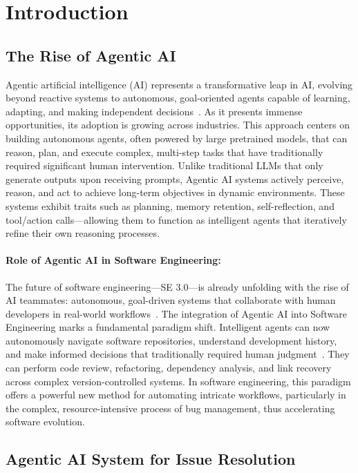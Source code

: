 \section{Introduction}

\subsection{The Rise of Agentic AI}

Agentic artificial intelligence (AI) represents a transformative leap in AI, evolving beyond reactive systems to autonomous, goal-oriented agents capable of learning, adapting, and making independent decisions~\cite{agentic_ai1}. As it presents immense opportunities, its adoption is growing across industries.  This approach centers on building autonomous agents, often powered by large pretrained models, that can reason, plan, and execute complex, multi-step tasks that have traditionally required significant human intervention. Unlike traditional LLMs that only generate outputs upon receiving prompts, Agentic AI systems actively perceive, reason, and act to achieve long-term objectives in dynamic environments. These systems exhibit traits such as planning, memory retention, self-reflection, and tool/action calls—allowing them to function as intelligent agents that iteratively refine their own reasoning processes.

\paragraph{Role of Agentic AI in Software Engineering:}

The future of software engineering—SE 3.0—is already unfolding with the rise of AI teammates: autonomous, goal-driven systems that collaborate with human developers in real-world workflows~\cite{arxiv250715003}. The integration of Agentic AI into Software Engineering marks a fundamental paradigm shift. Intelligent agents can now autonomously navigate software repositories, understand development history, and make informed decisions that traditionally required human judgment~\cite{traceability,btlink}. They can perform code review, refactoring, dependency analysis, and link recovery across complex version-controlled systems. In software engineering, this paradigm offers a powerful new method for automating intricate workflows, particularly in the complex, resource-intensive process of bug management, thus accelerating software evolution.

\subsection{Agentic AI System for Issue Resolution}

